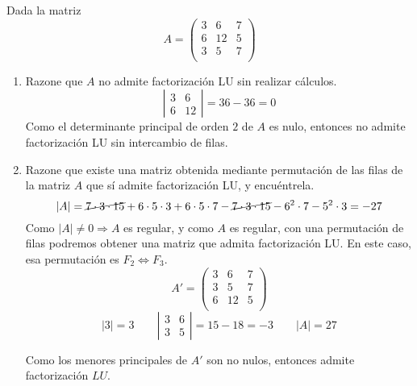 \documentclass[12pt]{article}
\begin{document}
\begin{ejercicio} 
    Dada la matriz
    \begin{equation*}
        A= \left( \begin{array}{ccc}
            3 & 6 & 7 \\
            6 & 12 & 5 \\
            3 & 5 & 7 \\
        \end{array}\right)
    \end{equation*}

    \begin{enumerate}
        \item Razone que $A$ no admite factorización LU sin realizar cálculos.
        \begin{equation*}
            \left| \begin{array}{cc}
                3 & 6 \\
                6 & 12
            \end{array}\right| = 36-36 = 0
        \end{equation*}
        Como el determinante principal de orden $2$ de $A$ es nulo, entonces no admite factorización LU sin intercambio de filas.

        \item Razone que existe una matriz obtenida mediante permutación de las filas de la matriz $A$ que sí admite factorización LU, y encuéntrela.
        \begin{equation*}
            |A|=\cancel{7\cdot 3 \cdot 15} + 6\cdot 5\cdot 3 + 6\cdot 5 \cdot 7 - \cancel{7\cdot3\cdot15} - 6^2\cdot 7 - 5^2\cdot 3 = -27
        \end{equation*}
        Como $|A|\neq 0 \Longrightarrow A$ es regular, y como $A$ es regular, con una permutación de filas podremos obtener una matriz que admita factorización LU. En este caso, esa permutación es $F_2\Longleftrightarrow F_3$.
        \begin{equation*}
            A'= \left( \begin{array}{ccc}
                3 & 6 & 7 \\
                3 & 5 & 7 \\
                6 & 12 & 5 \\
            \end{array}\right)
        \end{equation*}
        \begin{equation*}
            |3|=3 \qquad \left| \begin{array}{cc}
                3 & 6 \\
                3 & 5
            \end{array}\right| = 15 - 18 = -3 \qquad |A|=27
        \end{equation*}

        Como los menores principales de $A'$ son no nulos, entonces admite factorización $LU$.
    \end{enumerate}
\end{ejercicio}
\end{document}
